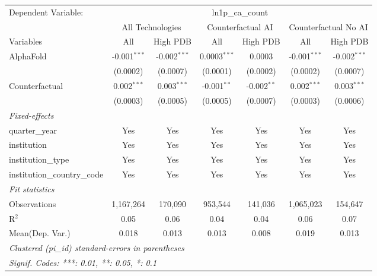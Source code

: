 \begingroup
\centering
\begin{tabular}{lcccccc}
   \tabularnewline \midrule \midrule
   Dependent Variable: & \multicolumn{6}{c}{ln1p\_ca\_count}\\
 & \multicolumn{2}{c}{All Technologies} & \multicolumn{2}{c}{Counterfactual AI} & \multicolumn{2}{c}{Counterfactual No AI} \\
\cmidrule(lr){1-1}\cmidrule(lr){2-3} \cmidrule(lr){4-5} \cmidrule(lr){6-7}
Variables & \multicolumn{1}{c}{All} & \multicolumn{1}{c}{High PDB} & \multicolumn{1}{c}{All} & \multicolumn{1}{c}{High PDB} & \multicolumn{1}{c}{All} & \multicolumn{1}{c}{High PDB} \\
\cmidrule(lr){1-1}\cmidrule(lr){2-2} \cmidrule(lr){3-3} \cmidrule(lr){4-4} \cmidrule(lr){5-5} \cmidrule(lr){6-6} \cmidrule(lr){7-7}
   AlphaFold                    & -0.001$^{***}$ & -0.002$^{***}$ & 0.0003$^{***}$ & 0.0003        & -0.001$^{***}$ & -0.002$^{***}$\\   
                                & (0.0002)       & (0.0007)       & (0.0001)       & (0.0002)      & (0.0002)       & (0.0007)\\   
   Counterfactual               & 0.002$^{***}$  & 0.003$^{***}$  & -0.001$^{**}$  & -0.002$^{**}$ & 0.002$^{***}$  & 0.003$^{***}$\\   
                                & (0.0003)       & (0.0005)       & (0.0005)       & (0.0007)      & (0.0003)       & (0.0006)\\   
   \midrule
   \emph{Fixed-effects}\\
   quarter\_year                & Yes            & Yes            & Yes            & Yes           & Yes            & Yes\\  
   institution                  & Yes            & Yes            & Yes            & Yes           & Yes            & Yes\\  
   institution\_type            & Yes            & Yes            & Yes            & Yes           & Yes            & Yes\\  
   institution\_country\_code   & Yes            & Yes            & Yes            & Yes           & Yes            & Yes\\  
   \midrule
   \emph{Fit statistics}\\
   Observations                 & 1,167,264      & 170,090        & 953,544        & 141,036       & 1,065,023      & 154,647\\  
   R$^2$                        & 0.05           & 0.06           & 0.04           & 0.04          & 0.06           & 0.07\\  
Mean(Dep. Var.) & 0.018 & 0.013 & 0.013 & 0.008 & 0.019 & 0.013 \\
   \midrule \midrule
   \multicolumn{7}{l}{\emph{Clustered (pi\_id) standard-errors in parentheses}}\\
   \multicolumn{7}{l}{\emph{Signif. Codes: ***: 0.01, **: 0.05, *: 0.1}}\\
\end{tabular}
\par\endgroup
